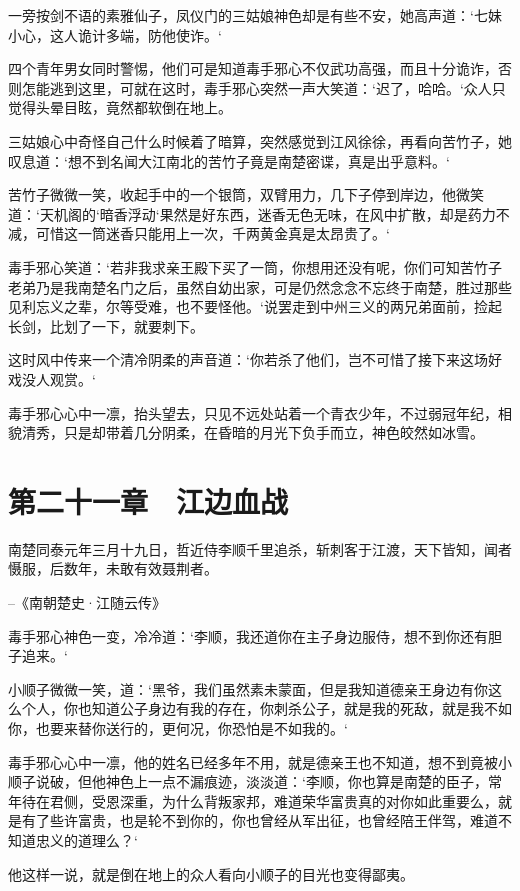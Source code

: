 一旁按剑不语的素雅仙子，凤仪门的三姑娘神色却是有些不安，她高声道：‘七妹小心，这人诡计多端，防他使诈。‘

四个青年男女同时警惕，他们可是知道毒手邪心不仅武功高强，而且十分诡诈，否则怎能逃到这里，可就在这时，毒手邪心突然一声大笑道：‘迟了，哈哈。‘众人只觉得头晕目眩，竟然都软倒在地上。

三姑娘心中奇怪自己什么时候着了暗算，突然感觉到江风徐徐，再看向苦竹子，她叹息道：‘想不到名闻大江南北的苦竹子竟是南楚密谍，真是出乎意料。‘

苦竹子微微一笑，收起手中的一个银筒，双臂用力，几下子停到岸边，他微笑道：‘天机阁的‘暗香浮动‘果然是好东西，迷香无色无味，在风中扩散，却是药力不减，可惜这一筒迷香只能用上一次，千两黄金真是太昂贵了。‘

毒手邪心笑道：‘若非我求亲王殿下买了一筒，你想用还没有呢，你们可知苦竹子老弟乃是我南楚名门之后，虽然自幼出家，可是仍然念念不忘终于南楚，胜过那些见利忘义之辈，尔等受难，也不要怪他。‘说罢走到中州三义的两兄弟面前，捡起长剑，比划了一下，就要刺下。

这时风中传来一个清冷阴柔的声音道：‘你若杀了他们，岂不可惜了接下来这场好戏没人观赏。‘

毒手邪心心中一凛，抬头望去，只见不远处站着一个青衣少年，不过弱冠年纪，相貌清秀，只是却带着几分阴柔，在昏暗的月光下负手而立，神色皎然如冰雪。

\chapter{第二十一章　江边血战}

南楚同泰元年三月十九日，哲近侍李顺千里追杀，斩刺客于江渡，天下皆知，闻者慑服，后数年，未敢有效聂荆者。

--《南朝楚史·江随云传》

毒手邪心神色一变，冷冷道：‘李顺，我还道你在主子身边服侍，想不到你还有胆子追来。‘

小顺子微微一笑，道：‘黑爷，我们虽然素未蒙面，但是我知道德亲王身边有你这么个人，你也知道公子身边有我的存在，你刺杀公子，就是我的死敌，就是我不如你，也要来替你送行的，更何况，你恐怕是不如我的。‘

毒手邪心心中一凛，他的姓名已经多年不用，就是德亲王也不知道，想不到竟被小顺子说破，但他神色上一点不漏痕迹，淡淡道：‘李顺，你也算是南楚的臣子，常年待在君侧，受恩深重，为什么背叛家邦，难道荣华富贵真的对你如此重要么，就是有了些许富贵，也是轮不到你的，你也曾经从军出征，也曾经陪王伴驾，难道不知道忠义的道理么？‘

他这样一说，就是倒在地上的众人看向小顺子的目光也变得鄙夷。

